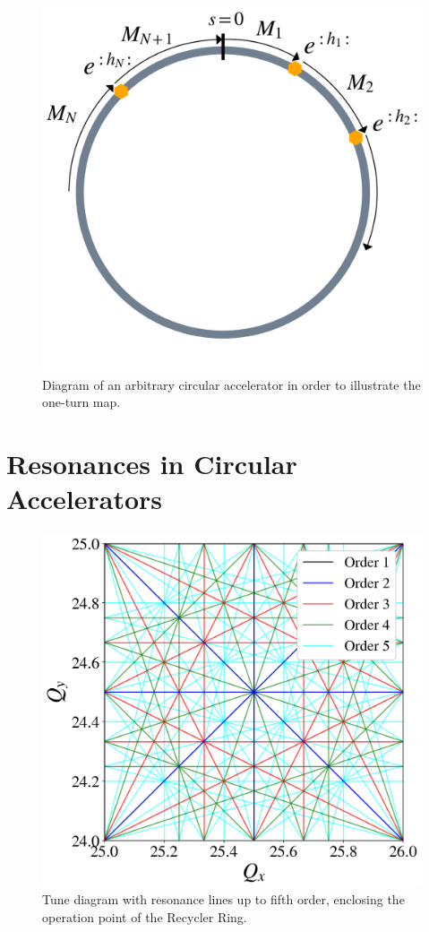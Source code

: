 \begin{figure}[H]
    \centering
    \includegraphics[width=0.7\columnwidth]{chapter1/oneturn.png}
    \caption{Diagram of an arbitrary circular accelerator in order to illustrate the one-turn map.}
    \label{fig:oneturn}
 \end{figure}


\section{Resonances in Circular Accelerators}
\cite{Wiedemann2015}

\begin{figure}[H]
    \centering
    \includegraphics[width=0.8\columnwidth]{chapter1/tunediagram.png}
    \caption{Tune diagram with resonance lines up to fifth order, enclosing the operation point of the Recycler Ring.}
    \label{fig:tunediagram}
 \end{figure}

